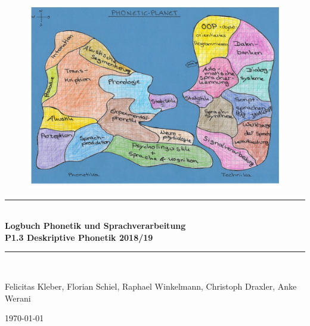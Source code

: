 \documentclass[11pt]{book}
\begin{document}
\begin{titlepage}
\begin{center}
\begin {figure}[t]
\includegraphics[width=1.0\textwidth] {grafiken/titel/landkarte.jpg} \\
\end{figure} 

\newcommand{\HRule}{\rule{\linewidth}{0.5mm}}
\HRule \\[0.3cm]
{ \huge \bfseries Logbuch Phonetik und Sprachverarbeitung}\\
{\bfseries P1.3 Deskriptive Phonetik 2018/19}
\\[0.4cm]
\HRule \\[0.5cm]

\begin{minipage}{0.4\textwidth}
\large
Felicitas Kleber, Florian Schiel, Raphael Winkelmann, Christoph Draxler, Anke Werani 

\end{minipage}

{\large \today}\vspace {1cm}


\end{center}
\end{titlepage}
\end{document}
